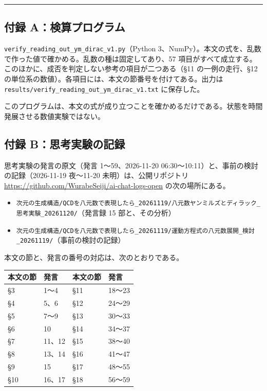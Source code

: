 \documentclass[
  a4paper,
]{ltjsarticle}
\newcounter{none} %
\providecommand{\tightlist}{%
  \setlength{\itemsep}{0pt}\setlength{\parskip}{0pt}}
\begin{document}
\begin{center}\rule{0.5\linewidth}{0.5pt}\end{center}

\subsection{付録
A：検算プログラム}\label{ux4ed8ux9332-aux691cux7b97ux30d7ux30edux30b0ux30e9ux30e0}

\texttt{verify\_\allowbreak{}reading\_\allowbreak{}out\_\allowbreak{}ym\_\allowbreak{}dirac\_\allowbreak{}v1.py}（Python
3、NumPy）。本文の式を、乱数で作った値で確かめる。乱数の種は固定してあり、57
項目がすべて成立する。このほかに、成否を判定しない参考の項目が二つある（§11
の一例の走行、§12
の単位系の数値）。各項目には、本文の節番号を付けてある。出力は
\texttt{results/\allowbreak{}verify\_\allowbreak{}reading\_\allowbreak{}out\_\allowbreak{}ym\_\allowbreak{}dirac\_\allowbreak{}v1.txt} に保存した。

このプログラムは、本文の式が成り立つことを確かめるだけである。状態を時間発展させる数値実験ではない。

\subsection{付録
B：思考実験の記録}\label{ux4ed8ux9332-bux601dux8003ux5b9fux9a13ux306eux8a18ux9332}

思考実験の発言の原文（発言 1〜59、2026-11-20
06:30〜10:11）と、事前の検討の記録（2026-11-19 夜〜11-20
未明）は、公開リポジトリ
\url{https://github.com/WurabeSeiji/ai-chat-logs-open} の次の場所にある。

\begin{itemize}
\tightlist
\item
  \texttt{次元の生成構造/\allowbreak{}QCDを八元数で表現したら\_\allowbreak{}20261119/\allowbreak{}八元数ヤンミルズとディラック\_\allowbreak{}思考実験\_\allowbreak{}20261120/\allowbreak{}}（発言録
  15 部と、その分析）
\item
  \texttt{次元の生成構造/\allowbreak{}QCDを八元数で表現したら\_\allowbreak{}20261119/\allowbreak{}運動方程式の八元数展開\_\allowbreak{}検討\_\allowbreak{}20261119/\allowbreak{}}（事前の検討の記録）
\end{itemize}

本文の節と、発言の番号の対応は、次のとおりである。

{\def\LTcaptype{none} %
\begin{longtable}[]{@{}llll@{}}
\toprule\noalign{}
本文の節 & 発言 & 本文の節 & 発言 \\
\midrule\noalign{}
\endhead
\bottomrule\noalign{}
\endlastfoot
§3 & 1〜4 & §11 & 18〜23 \\
§4 & 5、6 & §12 & 24〜29 \\
§5 & 7〜9 & §13 & 30〜33 \\
§6 & 10 & §14 & 34〜37 \\
§7 & 11、12 & §15 & 38〜40 \\
§8 & 13、14 & §16 & 41〜47 \\
§9 & 15 & §17 & 48〜55 \\
§10 & 16、17 & §18 & 56〜59 \\
\end{longtable}
}
\end{document}
